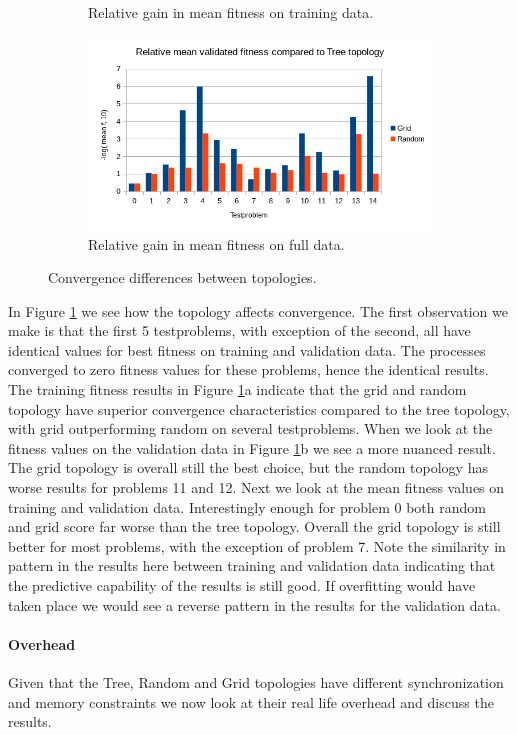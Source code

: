 \begin{figure}
\begin{subfigure}{0.6\textwidth}
        \caption{Relative gain in mean fitness on training data.}
    \end{subfigure}%
    \begin{subfigure}{0.6\textwidth}
    \centering
        \includegraphics[width=0.8\linewidth]{figures/distributedmeanvalidated.png}
        \caption{Relative gain in mean fitness on full data.}
    \end{subfigure}
    \caption{Convergence differences between topologies.}
    \label{fig:distributedresults}
    \end{figure}
In Figure \ref{fig:distributedresults} we see how the topology affects convergence. The first observation we make is that the first 5 testproblems, with exception of the second, all have identical values for best fitness on training and validation data. The processes converged to zero fitness values for these problems, hence the identical results. 
The training fitness results in Figure \ref{fig:distributedresults}a indicate that the grid and random topology have superior convergence characteristics compared to the tree topology, with grid outperforming random on several testproblems. When we look at the fitness values on the validation data in Figure \ref{fig:distributedresults}b we see a more nuanced result. The grid topology is overall still the best choice, but the random topology has worse results for problems 11 and 12.
Next we look at the mean fitness values on training and validation data. Interestingly enough for problem 0 both random and grid score far worse than the tree topology. Overall the grid topology is still better for most problems, with the exception of problem 7. Note the similarity in pattern in the results here between training and validation data indicating that the predictive capability of the results is still good. If overfitting would have taken place we would see a reverse pattern in the results for the validation data.

\paragraph{Overhead}
Given that the Tree, Random and Grid topologies have different synchronization and memory constraints we now look at their real life overhead and discuss the results.


